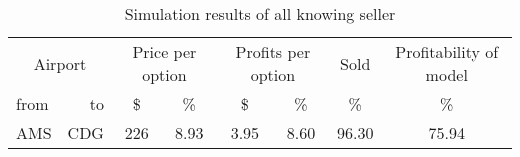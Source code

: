 \begin{table}[h]
\begin{center}
\begin{tabular}{l r c c c c c c}
\toprule
    \multicolumn{2}{c}{Airport}  &  \multicolumn{2}{c}{Price per option} & \multicolumn{2}{c}{Profits per option}  &  Sold  & Profitability of model \\[.4ex]
    from  &  to  &  \$  & \%  &  \$  & \%  & \%  & \% \\
    \midrule
AMS  &  CDG  &     226  &    8.93  &   3.95  &    8.60  &   96.30  &   75.94 \\
    \bottomrule
\end{tabular}
\caption{Simulation results of all knowing seller}
\label{tbl:resultsAllKnowing}
\end{center}
\end{table}


